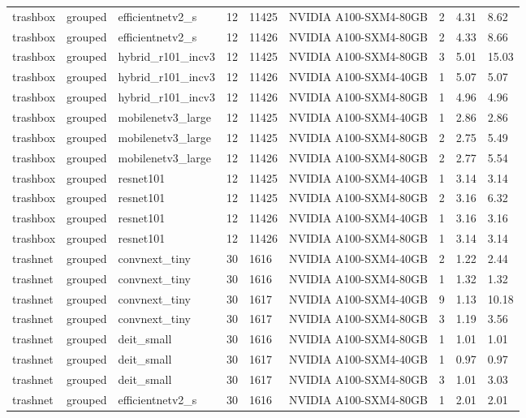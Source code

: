 \begin{table}[ht]
\begin{tabular}{lllllllll}
trashbox & grouped & efficientnetv2\_s & 12 & 11425 & NVIDIA A100-SXM4-80GB & 2 & 4.31 & 8.62 \\
trashbox & grouped & efficientnetv2\_s & 12 & 11426 & NVIDIA A100-SXM4-80GB & 2 & 4.33 & 8.66 \\
trashbox & grouped & hybrid\_r101\_incv3 & 12 & 11425 & NVIDIA A100-SXM4-80GB & 3 & 5.01 & 15.03 \\
trashbox & grouped & hybrid\_r101\_incv3 & 12 & 11426 & NVIDIA A100-SXM4-40GB & 1 & 5.07 & 5.07 \\
trashbox & grouped & hybrid\_r101\_incv3 & 12 & 11426 & NVIDIA A100-SXM4-80GB & 1 & 4.96 & 4.96 \\
trashbox & grouped & mobilenetv3\_large & 12 & 11425 & NVIDIA A100-SXM4-40GB & 1 & 2.86 & 2.86 \\
trashbox & grouped & mobilenetv3\_large & 12 & 11425 & NVIDIA A100-SXM4-80GB & 2 & 2.75 & 5.49 \\
trashbox & grouped & mobilenetv3\_large & 12 & 11426 & NVIDIA A100-SXM4-80GB & 2 & 2.77 & 5.54 \\
trashbox & grouped & resnet101 & 12 & 11425 & NVIDIA A100-SXM4-40GB & 1 & 3.14 & 3.14 \\
trashbox & grouped & resnet101 & 12 & 11425 & NVIDIA A100-SXM4-80GB & 2 & 3.16 & 6.32 \\
trashbox & grouped & resnet101 & 12 & 11426 & NVIDIA A100-SXM4-40GB & 1 & 3.16 & 3.16 \\
trashbox & grouped & resnet101 & 12 & 11426 & NVIDIA A100-SXM4-80GB & 1 & 3.14 & 3.14 \\
trashnet & grouped & convnext\_tiny & 30 & 1616 & NVIDIA A100-SXM4-40GB & 2 & 1.22 & 2.44 \\
trashnet & grouped & convnext\_tiny & 30 & 1616 & NVIDIA A100-SXM4-80GB & 1 & 1.32 & 1.32 \\
trashnet & grouped & convnext\_tiny & 30 & 1617 & NVIDIA A100-SXM4-40GB & 9 & 1.13 & 10.18 \\
trashnet & grouped & convnext\_tiny & 30 & 1617 & NVIDIA A100-SXM4-80GB & 3 & 1.19 & 3.56 \\
trashnet & grouped & deit\_small & 30 & 1616 & NVIDIA A100-SXM4-80GB & 1 & 1.01 & 1.01 \\
trashnet & grouped & deit\_small & 30 & 1617 & NVIDIA A100-SXM4-40GB & 1 & 0.97 & 0.97 \\
trashnet & grouped & deit\_small & 30 & 1617 & NVIDIA A100-SXM4-80GB & 3 & 1.01 & 3.03 \\
trashnet & grouped & efficientnetv2\_s & 30 & 1616 & NVIDIA A100-SXM4-80GB & 1 & 2.01 & 2.01 \\

\end{tabular}
\end{table}
